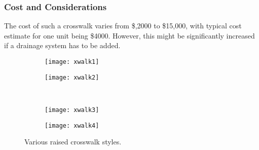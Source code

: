 \subsubsection{Cost and Considerations}

The cost of such a crosswalk varies from \$,2000 to \$15,000, with typical cost estimate for one unit being \$4000\cite{traffic-calming-xwalks}. However, this might be significantly increased if a drainage system has to be added.

\begin{figure}[!htbp]
\centering
\begin{subfigure}[t]{0.45\textwidth}
	\texttt{[image: xwalk1]}
\end{subfigure}
\begin{subfigure}[t]{0.45\textwidth}
	\texttt{[image: xwalk2]}
\end{subfigure}\\
\begin{subfigure}[t]{0.45\textwidth}
	\texttt{[image: xwalk3]}
\end{subfigure}
\begin{subfigure}[t]{0.45\textwidth}
	\texttt{[image: xwalk4]}
\end{subfigure}
\caption[Various raised crosswalk styles]{Various raised crosswalk styles.\cite{traffic-calming-xwalks}}
\end{figure}

\newpage